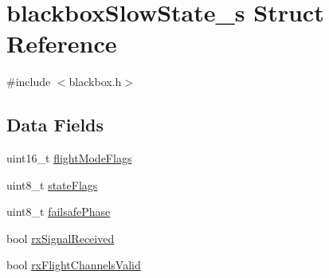 \hypertarget{structblackboxSlowState__s}{\section{blackbox\+Slow\+State\+\_\+s Struct Reference}
\label{structblackboxSlowState__s}
}


{\ttfamily \#include $<$blackbox.\+h$>$}

\subsection*{Data Fields}
\begin{DoxyCompactItemize}
\item 
uint16\+\_\+t \hyperlink{structblackboxSlowState__s_a1375a77faa6162ef35fbf2fa5f403ad1}{flight\+Mode\+Flags}
\item 
uint8\+\_\+t \hyperlink{structblackboxSlowState__s_a7ff5c026dce2ac875d6e0eba17a94eb9}{state\+Flags}
\item 
uint8\+\_\+t \hyperlink{structblackboxSlowState__s_a5b2e7941be4f7abe5f5f1e408c530cc9}{failsafe\+Phase}
\item 
bool \hyperlink{structblackboxSlowState__s_abb1153d434def3fec7b8c0d8a971a2fa}{rx\+Signal\+Received}
\item 
bool \hyperlink{structblackboxSlowState__s_a232e5100c553ce732ceb98045e795771}{rx\+Flight\+Channels\+Valid}
\end{DoxyCompactItemize}


